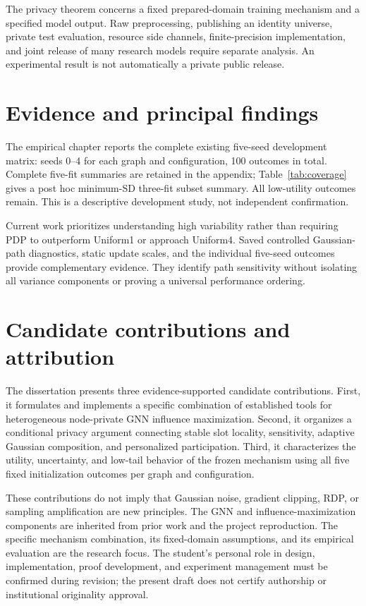 The privacy theorem concerns a fixed prepared-domain training mechanism and a specified model output. Raw preprocessing, publishing an identity universe, private test evaluation, resource side channels, finite-precision implementation, and joint release of many research models require separate analysis. An experimental result is not automatically a private public release.

\section{Evidence and principal findings}
The empirical chapter reports the complete existing five-seed development matrix: seeds 0--4 for each graph and configuration, 100 outcomes in total. Complete five-fit summaries are retained in the appendix; Table~\ref{tab:coverage} gives a post hoc minimum-SD three-fit subset summary. All low-utility outcomes remain. This is a descriptive development study, not independent confirmation.

Current work prioritizes understanding high variability rather than requiring PDP to outperform Uniform1 or approach Uniform4. Saved controlled Gaussian-path diagnostics, static update scales, and the individual five-seed outcomes provide complementary evidence. They identify path sensitivity without isolating all variance components or proving a universal performance ordering.

\section{Candidate contributions and attribution}
The dissertation presents three evidence-supported candidate contributions. First, it formulates and implements a specific combination of established tools for heterogeneous node-private GNN influence maximization. Second, it organizes a conditional privacy argument connecting stable slot locality, sensitivity, adaptive Gaussian composition, and personalized participation. Third, it characterizes the utility, uncertainty, and low-tail behavior of the frozen mechanism using all five fixed initialization outcomes per graph and configuration.

These contributions do not imply that Gaussian noise, gradient clipping, RDP, or sampling amplification are new principles. The GNN and influence-maximization components are inherited from prior work and the project reproduction. The specific mechanism combination, its fixed-domain assumptions, and its empirical evaluation are the research focus. The student's personal role in design, implementation, proof development, and experiment management must be confirmed during revision; the present draft does not certify authorship or institutional originality approval.

